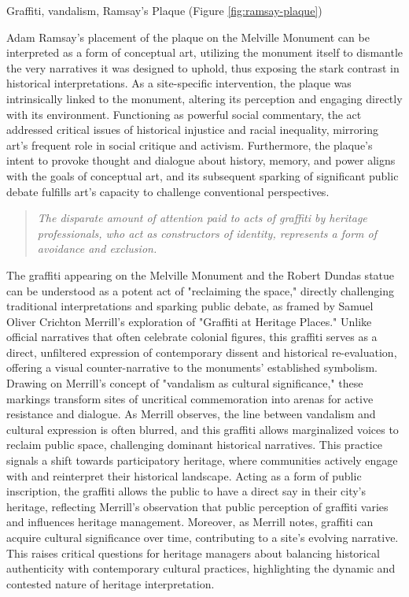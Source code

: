\documentclass{scrartcl}
\begin{document}
Graffiti, vandalism, Ramsay's Plaque (Figure \ref{fig:ramsay-plaque})

Adam Ramsay's placement of the plaque on the Melville Monument can be interpreted as a form of conceptual art, utilizing the monument itself to dismantle the very narratives it was designed to uphold, thus exposing the stark contrast in historical interpretations. As a site-specific intervention, the plaque was intrinsically linked to the monument, altering its perception and engaging directly with its environment. Functioning as powerful social commentary, the act addressed critical issues of historical injustice and racial inequality, mirroring art's frequent role in social critique and activism. Furthermore, the plaque's intent to provoke thought and dialogue about history, memory, and power aligns with the goals of conceptual art, and its subsequent sparking of significant public debate fulfills art's capacity to challenge conventional perspectives.

\begin{quotation}
\textit{The disparate amount of attention paid to acts of graffiti by heritage professionals, who act as constructors of identity, represents a form of avoidance and exclusion.}
\end{quotation}
\cite{merrill_2011}
The graffiti appearing on the Melville Monument and the Robert Dundas statue can be understood as a potent act of "reclaiming the space," directly challenging traditional interpretations and sparking public debate, as framed by Samuel Oliver Crichton Merrill's exploration of "Graffiti at Heritage Places." Unlike official narratives that often celebrate colonial figures, this graffiti serves as a direct, unfiltered expression of contemporary dissent and historical re-evaluation, offering a visual counter-narrative to the monuments' established symbolism. Drawing on Merrill's concept of "vandalism as cultural significance," these markings transform sites of uncritical commemoration into arenas for active resistance and dialogue. As Merrill observes, the line between vandalism and cultural expression is often blurred, and this graffiti allows marginalized voices to reclaim public space, challenging dominant historical narratives. This practice signals a shift towards participatory heritage, where communities actively engage with and reinterpret their historical landscape. Acting as a form of public inscription, the graffiti allows the public to have a direct say in their city's heritage, reflecting Merrill's observation that public perception of graffiti varies and influences heritage management. Moreover, as Merrill notes, graffiti can acquire cultural significance over time, contributing to a site's evolving narrative. This raises critical questions for heritage managers about balancing historical authenticity with contemporary cultural practices, highlighting the dynamic and contested nature of heritage interpretation.
\end{document}
